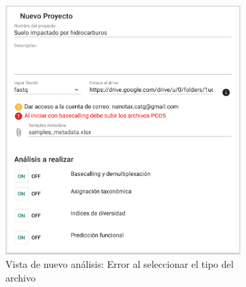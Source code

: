 \begin{itemize}
\begin{itemize}
\begin{itemize}
    \end{itemize}
\end{itemize}


\begin{figure}[H]
    \centering
    \begin{subfigure}[b]{0.45\textwidth}
        \centering
        \includegraphics[width=\textwidth]{images/app/newAnalysis/pod5-error.png}
        \caption{Vista de nuevo análisis: Error al seleccionar el tipo del archivo}
        \label{fig:app-new-analysis-pod5-error}
    \end{subfigure}
    \hfill
    \begin{subfigure}[b]{0.45\textwidth}
        \centering

\end{subfigure}
\end{figure}
\end{itemize}
